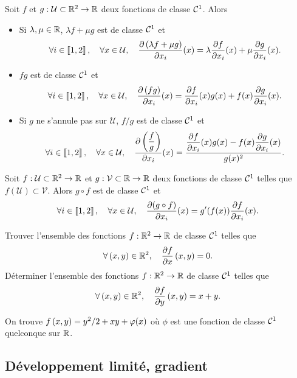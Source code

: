 \documentclass{magnolia}
\begin{document}
\begin{proposition}
Soit $f$ et $g:\mathcal{U}\subset\mathbb{R}^2\to\mathbb{R}$ deux fonctions de classe $\mathcal{C}^{1}$.
Alors
\begin{itemize}
\item Si $\lambda,\mu\in\mathbb{R}$, $\lambda f+\mu g$ est de classe $\mathcal{C}^{1}$ et
  \[\forall i\in\left\llbracket 1,2\right\rrbracket ,\quad \forall x\in\mathcal{U} ,\quad
    \frac{\partial \left(\lambda f+\mu g\right)}{\partial x_i}(x)=\lambda\frac{\partial f}{\partial x_i}(x)+\mu
    \frac{\partial g}{\partial x_i}(x).\]
\item $fg$ est de classe $\mathcal{C}^{1}$ et
  \[\forall i\in\left\llbracket 1,2\right\rrbracket ,\quad \forall x\in\mathcal{U} ,\quad
    \frac{\partial \left(fg\right)}{\partial x_i}(x)=\frac{\partial f}{\partial x_i}(x)g(x)+
    f(x)\frac{\partial g}{\partial x_i}(x).\]
\item Si $g$ ne s'annule pas sur $\mathcal{U}$, $f/g$ est de classe
  $\mathcal{C}^{1}$ et
  \[\forall i\in\left\llbracket 1,2\right\rrbracket ,\quad \forall x\in\mathcal{U} ,\quad
    \frac{\partial \left(\displaystyle\frac{f}{g}\right)}{\partial x_i}(x)=
    \frac{\displaystyle\frac{\partial f}{\partial x_i}(x)g(x)-
    f(x)\displaystyle\frac{\partial g}{\partial x_i}(x)}{g(x)^2}.\]
\end{itemize}
\end{proposition}

\begin{proposition}
Soit $f:\mathcal{U}\subset\mathbb{R}^2\to\mathbb{R}$ et $g:\mathcal{V}\subset\mathbb{R}\to\mathbb{R}$ deux fonctions de
classe $\mathcal{C}^{1}$ telles que $f(\mathcal{U})\subset\mathcal{V}$. Alors
$g\circ f$ est de classe $\mathcal{C}^{1}$ et
\[\forall i\in\left\llbracket 1,2\right\rrbracket,\quad \forall x\in\mathcal{U},\quad
  \frac{\partial (g\circ f)}{\partial x_i}(x)=g'(f(x))\frac{\partial f}{\partial x_i}(x).\]
\end{proposition}

\begin{exoUnique}
\exo Trouver l'ensemble des fonctions $f:\mathbb{R}^2\to\mathbb{R}$ de classe $\mathcal{C}^{1}$ telles que
  \[\forall\left(x,y\right)\in\mathbb{R}^2 ,\quad \frac{\partial f}{\partial x} \left(x,y\right)=0.\]
\exo Déterminer l'ensemble des fonctions $f:\mathbb{R}^2\to\mathbb{R}$ de classe $\mathcal{C}^{1}$ telles que
  \[\forall\left(x,y\right)\in\mathbb{R}^2 ,\quad \frac{\partial f}{\partial y} \left(x,y\right)= x+y.\]
  \begin{sol}
  On trouve $f\left(x,y\right)=y^2/2+xy+\varphi(x)$ où $\phi$ est une fonction de classe
  $\mathcal{C}^{1}$ quelconque sur $\mathbb{R}$.
  \end{sol}
\end{exoUnique}

\subsection{Développement limité, gradient}
\end{document}
